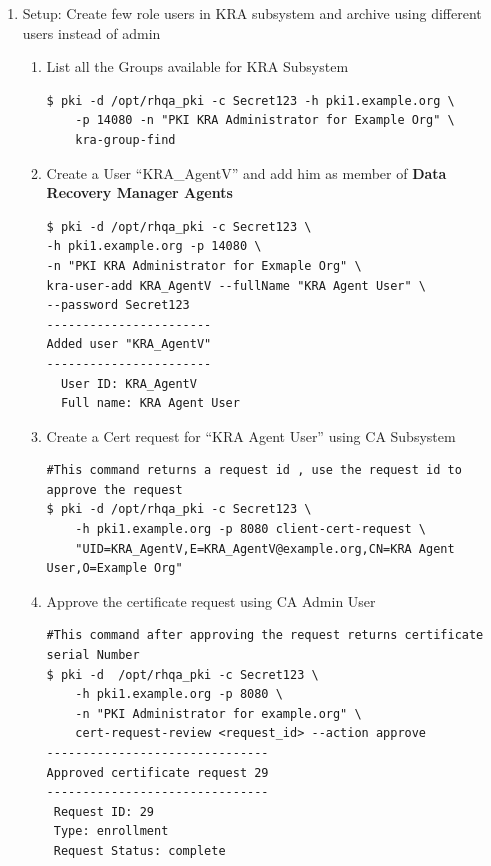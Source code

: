 \documentclass[12pt]{report}
\begin{document}
\begin{enumerate}[label*=\arabic*.]
\begin{enumerate}[label*=\arabic*.]
                \item Setup: Create few role users in KRA subsystem and archive using different users instead of admin
                    \begin{enumerate}[label*=\arabic*.]
                        \item List all the Groups available for KRA Subsystem
                            \begin{lstlisting}[style=bashInputStyle]
$ pki -d /opt/rhqa_pki -c Secret123 -h pki1.example.org \
    -p 14080 -n "PKI KRA Administrator for Example Org" \
    kra-group-find                                
                            \end{lstlisting}
                        \item Create a User ``KRA\_AgentV'' and add him as member of \textbf{Data Recovery Manager Agents} 
                            \begin{lstlisting}[style=bashInputStyle]
$ pki -d /opt/rhqa_pki -c Secret123 \
-h pki1.example.org -p 14080 \
-n "PKI KRA Administrator for Exmaple Org" \
kra-user-add KRA_AgentV --fullName "KRA Agent User" \
--password Secret123
-----------------------
Added user "KRA_AgentV"
-----------------------
  User ID: KRA_AgentV
  Full name: KRA Agent User
                            \end{lstlisting}
                        \item Create a Cert request for ``KRA Agent User'' using CA Subsystem 
                            \begin{lstlisting}[style=bashInputStyle]
#This command returns a request id , use the request id to approve the request
$ pki -d /opt/rhqa_pki -c Secret123 \
    -h pki1.example.org -p 8080 client-cert-request \
    "UID=KRA_AgentV,E=KRA_AgentV@example.org,CN=KRA Agent User,O=Example Org" 
                            \end{lstlisting}
                        \item Approve the certificate request using CA Admin User
                            \begin{lstlisting}[style=bashInputStyle]
#This command after approving the request returns certificate serial Number
$ pki -d  /opt/rhqa_pki -c Secret123 \
    -h pki1.example.org -p 8080 \
    -n "PKI Administrator for example.org" \
    cert-request-review <request_id> --action approve
-------------------------------
Approved certificate request 29
-------------------------------
 Request ID: 29
 Type: enrollment
 Request Status: complete

\end{lstlisting}
\end{enumerate}
\end{enumerate}
\end{enumerate}
\end{document}

